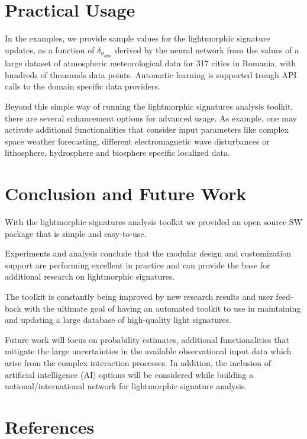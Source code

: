 \documentclass[twoside,11pt]{article}
\begin{document}
\section{Practical Usage}
In the examples, we provide sample values for the lightmorphic signature updates, as a function of $\delta_{\phi_{atm}}$ derived by the neural network from the values of a large dataset of atmospheric meteorological data for 317 cities in Romania, with hundreds of thousands data points. Automatic learning is supported trough API calls to the domain specific data providers.

Beyond this simple way of running the lightmorphic signatures analysis toolkit, there are several enhancement options for advanced usage. As example, one may activate additional functionalities that consider input parameters like complex space weather forecasting, different electromagnetic wave disturbances or lithosphere, hydrosphere and biosphere specific localized data.
\section{Conclusion and Future Work}
With the lightmorphic signatures analysis toolkit we provided an open source SW package that is simple and easy-to-use. 

Experiments and analysis conclude that the modular design and customization support are performing excellent in practice and can provide the base for additional research on lightmorphic signatures. 

The toolkit is constantly being improved by new research results and user feed-back with the ultimate goal of having an automated toolkit to use in maintaining and updating a large database of high-quality light signatures. 

Future work will focus on probability estimates, additional functionalities that mitigate the large uncertainties in the available observational input data which arise from the complex interaction processes. In addition, the inclusion of artificial intelligence (AI) options will be considered while building a national/international network for lightmorphic signature analysis.
\newpage
\section{References}
\nocite{*}

\end{document}
